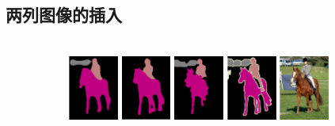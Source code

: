 \subsection{两列图像的插入}

\begin{figure}[h!] %
	\begin{subfigure}{0.55\textwidth}
		 \\
		\includegraphics[width=0.18\textwidth]{image/chap04/result/compare/my_horse.pdf}
		\includegraphics[width=0.18\textwidth]{image/chap04/result/compare/fcn_horse.png}
		\includegraphics[width=0.18\textwidth]{image/chap04/result/compare/sds_horse.png}
		\includegraphics[width=0.18\textwidth]{image/chap04/result/compare/gt_horse.pdf}
		\includegraphics[width=0.18\textwidth]{image/chap04/result/compare/im_horse.pdf}

\end{subfigure}
\end{figure}
